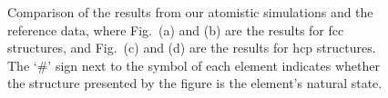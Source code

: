 \documentclass[%
 reprint,
 amsmath,amssymb,
 aps,
]{revtex4-1}
\begin{document}
\noindent\begin{figure}
\centering
\noindent\ignorespaces
{}
\newline
{}
\newline
{}
\newline
{}
\caption{\label{fig:compare}
 Comparison of the results from our atomistic simulations and the reference data, where Fig.~(a) and (b) are the results for fcc structures, and Fig.~(c) and (d) are the results for hcp structures.
 The `\#' sign next to the symbol of each element indicates whether the structure presented by the figure is the element's natural state.
}
\end{figure}
\end{document}
